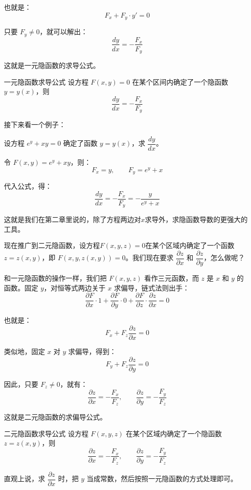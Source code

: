 也就是：
\[
F_x + F_y \cdot y' = 0
\]

只要 $F_y \neq 0$，就可以解出：
\[
\frac{dy}{dx} = -\frac{F_x}{F_y}
\]

这就是一元隐函数的求导公式。

\begin{theorem}{一元隐函数求导公式}{}
  设方程 $F(x, y) = 0$ 在某个区间内确定了一个隐函数 $y = y(x)$，则
  \[
  \frac{dy}{dx} = -\frac{F_x}{F_y}
  \]
\end{theorem}

接下来看一个例子：

\begin{myexample}
设方程 $e^y + xy = 0$ 确定了函数 $y = y(x)$，求 $\dfrac{dy}{dx}$。

令 $F(x, y) = e^y + xy$，则：
\[
F_x = y,\qquad F_y = e^y + x
\]

代入公式，得：
\[
\frac{dy}{dx} = -\frac{F_x}{F_y} = -\frac{y}{e^y + x}
\]
\end{myexample}

这就是我们在第二章里说的，除了方程两边对$x$求导外，求隐函数导数的更强大的工具。

现在推广到二元隐函数，设方程$F(x, y, z) = 0$在某个区域内确定了一个函数 $z = z(x, y)$，即 $F(x, y, z(x,y)) = 0$。我们现在要求 $\dfrac{\partial z}{\partial x}$ 和 $\dfrac{\partial z}{\partial y}$，怎么做呢？

和一元隐函数的操作一样，我们把 $F(x,y,z)$ 看作三元函数，而 $z$ 是 $x$ 和 $y$ 的函数。固定 $y$，对恒等式两边关于 $x$ 求偏导，链式法则出手：
\[
\frac{\partial F}{\partial x} \cdot 1 + \frac{\partial F}{\partial y} \cdot 0 + \frac{\partial F}{\partial z} \cdot \frac{\partial z}{\partial x} = 0
\]

也就是：
\[
F_x + F_z \frac{\partial z}{\partial x} = 0
\]

类似地，固定 $x$ 对 $y$ 求偏导，得到：
\[
F_y + F_z \frac{\partial z}{\partial y} = 0
\]

因此，只要 $F_z \neq 0$，就有：
\[
\frac{\partial z}{\partial x} = -\frac{F_x}{F_z},\qquad
\frac{\partial z}{\partial y} = -\frac{F_y}{F_z}
\]

这就是二元隐函数的求偏导公式。

\begin{theorem}{二元隐函数求导公式}{}
  设方程 $F(x,y,z)$ 在某个区域内确定了一个隐函数 $z = z(x,y)$，则
\[
\frac{\partial z}{\partial x} = -\frac{F_x}{F_z},\qquad
\frac{\partial z}{\partial y} = -\frac{F_y}{F_z}
\]
\end{theorem}

直观上说，求 $\dfrac{\partial z}{\partial x}$ 时，把 $y$ 当成常数，然后按照一元隐函数的方式处理即可。


